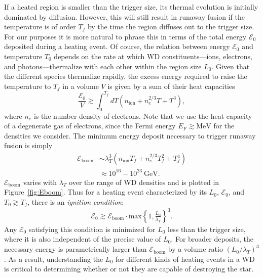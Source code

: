 \documentclass[preprintnumbers,amsmath,amssymb,prd,superscriptaddress]{revtex4}
\newcommand{\Ez}{\mathcal{E}_0}
\newcommand{\Eboom}{\mathcal{E}_\text{boom}}
\newcommand{\GeV}{\text{GeV}}
\newcommand{\MeV}{\text{MeV}}
\begin{document}
If a heated region is smaller than the trigger size, its thermal evolution is initially dominated by diffusion.
However, this will still result in runaway fusion if the temperature is of order $T_f$ by the time the region diffuses out to the trigger size.
For our purposes it is more natural to phrase this in terms of the total energy $\Ez$ deposited during a heating event.
Of course, the relation between energy $\Ez$ and temperature $T_0$ depends on the rate at which WD constituents---ions, electrons, and photons---thermalize with each other within the region size $L_0$.
Given that the different species thermalize rapidly, the excess energy required to raise the temperature to $T_f$ in a volume $V$ is given by a sum of their heat capacities
\begin{equation}
\label{eq:heatcapacity}
  \frac{\Ez}{V} \gtrsim \int_0^{T_f} dT (n_\text{ion} + n_e^{2/3} T + T^3),
\end{equation}
where $n_e$ is the number density of electrons.
Note that we use the heat capacity of a degenerate gas of electrons, since the Fermi energy $E_F \gtrsim \MeV$ for the densities we consider.
The minimum energy deposit necessary to trigger runaway fusion is simply
\begin{align}
\label{eq:Eboom}
\Eboom &\sim \lambda_T^3 (n_\text{ion} T_f + n_e^{2/3} T_f^2 + T_f^4) \\
&\approx 10^{16} - 10^{23} ~\GeV. \nonumber
\end{align}
$\Eboom$ varies with $\lambda_T$ over the range of WD densities and is plotted in Figure~\ref{fig:Eboom}.
Thus for a heating event characterized by its $L_0$, $\Ez$, and $T_0 \gtrsim T_f$, there is an \emph{ignition condition}:
\begin{align}
    \label{eq:energy_boom_condition}
    \Ez \gtrsim
    \Eboom \cdot \text{max}\left\{1, \frac{L_0}{\lambda_T}\right\}^3.
\end{align}
Any $\Ez$ satisfying this condition is minimized for $L_0$ less than the trigger size, where it is also independent of the precise value of $L_0$.
For broader deposits, the necessary energy is parametrically larger than $\Eboom$ by a volume ratio $(L_0/\lambda_T)^3$.
As a result, understanding the $L_0$ for different kinds of heating events in a WD is critical to determining whether or not they are capable of destroying the star.
\end{document}
